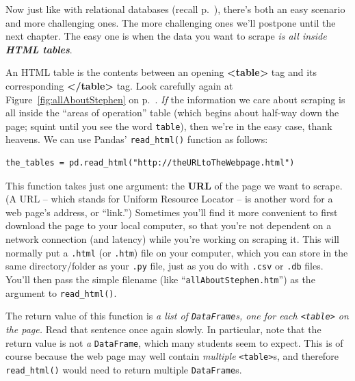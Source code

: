 
Now just like with relational databases (recall p.~\pageref{easy1}), there's
both an easy scenario and more challenging ones. The more challenging ones
we'll postpone until the next chapter. The easy one is when the data you want
to scrape \textit{is all inside \textbf{HTML tables}}. 


An HTML table is the contents between an opening \textbf{<table>} tag and its
corresponding \textbf{</table>} tag. Look carefully again at
Figure~\ref{fig:allAboutStephen} on p.~\pageref{fig:allAboutStephen}.
\textit{If} the information we care about scraping is all inside the ``areas of
operation'' table (which begins about half-way down the page; squint until you
see the word \texttt{table}), then we're in the easy case, thank heavens. We
can use Pandas' \texttt{read\_html()} function as follows:

\vspace{-.1in}
\begin{Verbatim}[fontsize=\footnotesize,samepage=true,frame=single,framesep=3mm]
the_tables = pd.read_html("http://theURLtoTheWebpage.html")
\end{Verbatim}
\vspace{-.1in}



\label{downloading}

This function takes just one argument: the \textbf{URL} of the page we want to
scrape. (A URL -- which stands for Uniform Resource Locator -- is another word
for a web page's address, or ``link.'') Sometimes you'll find it more
convenient to first download the page to your local computer, so that you're
not dependent on a network connection (and latency) while you're working on
scraping it. This will normally put a \texttt{.html} (or \texttt{.htm}) file on
your computer, which you can store in the same directory/folder as your
\texttt{.py} file, just as you do with \texttt{.csv} or \texttt{.db} files.
You'll then pass the simple filename (like ``\texttt{allAboutStephen.htm}'') as
the argument to \texttt{read\_html()}.

The return value of this function is \textit{a list of \texttt{DataFrame}s, one
for each \texttt{<table>} on the page.} Read that sentence once again slowly.
In particular, note that the return value is not \textit{a} \texttt{DataFrame},
which many students seem to expect. This is of course because the web page may
well contain \textit{multiple} \texttt{<table>}s, and therefore
\texttt{read\_html()} would need to return multiple \texttt{DataFrame}s.


